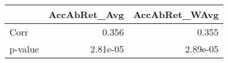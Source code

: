 \begin{tabular}{lrr}
\toprule
 & AccAbRet\_Avg & AccAbRet\_WAvg \\
\midrule
Corr & 0.356 & 0.355 \\
p-value & 2.81e-05 & 2.89e-05 \\
\bottomrule
\end{tabular}

